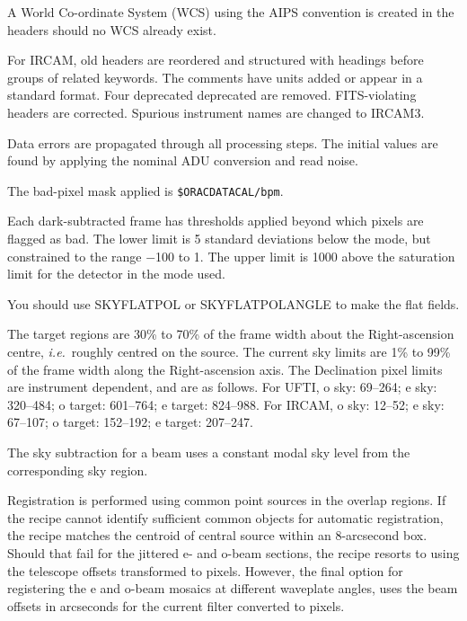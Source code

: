 \documentclass[twoside,11pt]{article}
\newcommand{\htmlref}[2]{#1}
\renewcommand{\_}{\texttt{\symbol{95}}}
\newcommand{\sstitem}{\item}
\begin{document}
{{{         \sstitem
         A World Co-ordinate System (WCS) using the AIPS convention is
         created in the headers should no WCS already exist.

         \sstitem
         For IRCAM, old headers are reordered and structured with
         headings before groups of related keywords.  The comments have
         units added or appear in a standard format.  Four deprecated
         deprecated are removed.  FITS-violating headers are corrected.
         Spurious instrument names are changed to IRCAM3.

         \sstitem
         Data errors are propagated through all processing steps.
         The initial values are found by applying the nominal ADU conversion
         and read noise.

         \sstitem
         The bad-pixel mask applied is {\tt\$ORAC\_DATA\_CAL/bpm}.

         \sstitem
         Each dark-subtracted frame has thresholds applied beyond which
         pixels are flagged as bad.  The lower limit is 5 standard
         deviations below the mode, but constrained to the range $-$100 to 1.
         The upper limit is 1000 above the saturation limit for the detector
         in the mode used.

         \sstitem
         You should use \htmlref{SKY\_FLAT\_POL}{SKY\_FLAT\_POL} or
         \htmlref{SKY\_FLAT\_POL\_ANGLE}{SKY\_FLAT\_POL\_ANGLE} to make the
         flat fields.

         \sstitem
         The target regions are 30\% to 70\% of the frame width about
         the Right-ascension centre, {\em{i.e.}}\ roughly centred on the source.
         The current sky limits are 1\% to 99\% of the frame width along the
         Right-ascension axis.  The Declination pixel limits are instrument
         dependent, and are as follows.  For UFTI, o sky: 69--264;
         e sky: 320--484; o target: 601--764; e target: 824--988.  For
         IRCAM, o sky: 12--52; e sky: 67--107; o target: 152--192;
         e target: 207--247.

         \sstitem
         The sky subtraction for a beam uses a constant modal sky level
         from the corresponding sky region.

         \sstitem
         Registration is performed using common point sources in the
         overlap regions.  If the recipe cannot identify sufficient common
         objects for automatic registration, the recipe matches the centroid
         of central source within an 8-arcsecond box.  Should that fail for
         the jittered e- and o-beam sections, the recipe resorts to using the
         telescope offsets transformed to pixels.  However, the final option
         for registering the e and o-beam mosaics at different waveplate
         angles, uses the beam offsets in arcseconds for the current filter
         converted to pixels.

}}}
\end{document}
